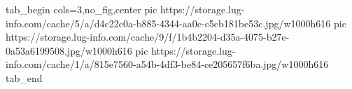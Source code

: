  
 
 
 
 


\ifcmt
  tab_begin cols=3,no_fig,center
     pic https://storage.lug-info.com/cache/5/a/d4c22c0a-b885-4344-aa0c-c5cb181be53c.jpg/w1000h616%
     pic https://storage.lug-info.com/cache/9/f/1b4b2204-d35a-4075-b27e-0a53a6199508.jpg/w1000h616%
     pic https://storage.lug-info.com/cache/1/a/815e7560-a54b-4df3-be84-ce205657f6ba.jpg/w1000h616%
  tab_end
\fi
